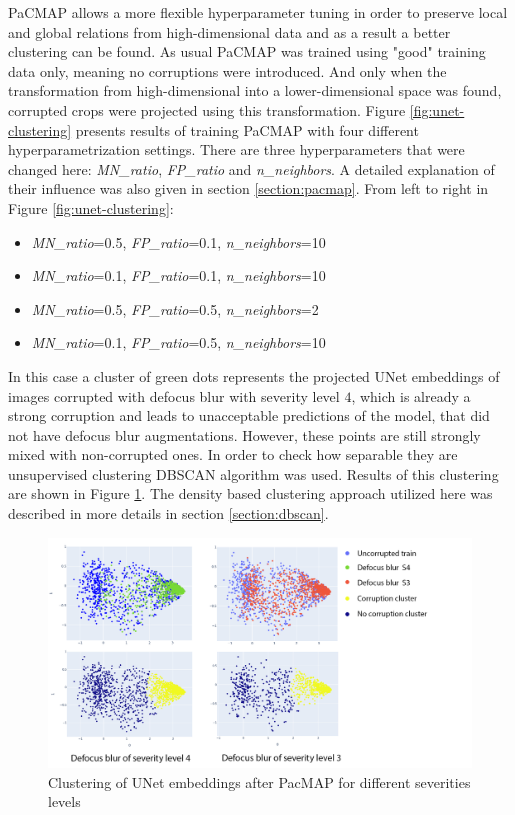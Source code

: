 PaCMAP allows a more flexible hyperparameter tuning in order to preserve local and global relations from high-dimensional data and as a result a better clustering can be found. As usual PaCMAP was trained using "good" training data only, meaning no corruptions were introduced. And only when the transformation from high-dimensional into a lower-dimensional space was found, corrupted crops were projected using this transformation. Figure \ref{fig:unet-clustering} presents results of training PaCMAP with four different hyperparametrization settings. There are three hyperparameters that were changed here: \textit{MN\_ratio}, \textit{FP\_ratio} and \textit{n\_neighbors}. A detailed explanation of their influence was also given in section \ref{section:pacmap}. From left to right in Figure \ref{fig:unet-clustering}:

\begin{itemize}
	\item \textit{MN\_ratio}=0.5, \textit{FP\_ratio}=0.1, \textit{n\_neighbors}=10
	\item \textit{MN\_ratio}=0.1, \textit{FP\_ratio}=0.1, \textit{n\_neighbors}=10
	\item \textit{MN\_ratio}=0.5, \textit{FP\_ratio}=0.5, \textit{n\_neighbors}=2
	\item \textit{MN\_ratio}=0.1, \textit{FP\_ratio}=0.5, \textit{n\_neighbors}=10
\end{itemize}

In this case a cluster of green dots represents the projected UNet embeddings of images corrupted with defocus blur with severity level $4$, which is already a strong corruption and leads to unacceptable predictions of the model, that did not have defocus blur augmentations. However, these points are still strongly mixed with non-corrupted ones. In order to check how separable they are unsupervised clustering DBSCAN algorithm was used. Results of this clustering are shown in Figure \ref{fig:unet-clustering-sev-levels}. The density based clustering approach utilized here was described in more details in section \ref{section:dbscan}. 

\begin{figure}[htb]
	\begin{center}
		\includegraphics[width=0.6\linewidth]{bilder/unet-embeddings/db-levels.png}
		\caption{Clustering of UNet embeddings after PacMAP for different severities levels}
		\label{fig:unet-clustering-sev-levels}
	\end{center}
\end{figure}

